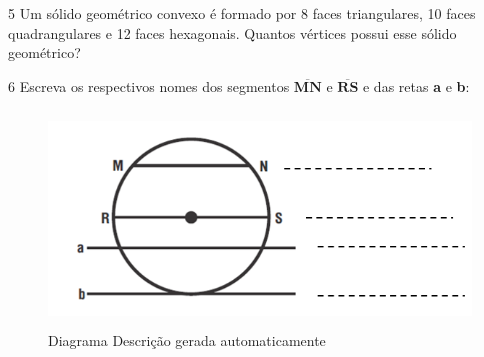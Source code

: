 \begin{escolha}
\begin{boxmedio}
\begin{boxmedio}
{\begin{boxpeq}
\begin{boxpeq}
{\begin{boxpeq}
\begin{boxmedio}
\begin{boxmedio}
\begin{boxpeq}
\begin{boxmedio}
\begin{boxpeq}
\begin{boxpeq}
\begin{boxpeq}
\begin{boxpeq}
\begin{boxmedio}
{\begin{boxmedio}
\begin{boxmedio}
\begin{boxpeq}
\begin{boxmedio}
\begin{boxpeq}
\begin{boxpeq}
\begin{boxpeq}
\begin{escolha}
{\begin{boxmedio}
\begin{boxpeq}
\begin{boxpeq}
\begin{boxpeq}
\begin{boxpeq}
\begin{boxpeq}
\begin{boxmedio}
\begin{boxpeq}
\begin{boxpeq}
\begin{boxpeq}
{\begin{boxpeq}
\begin{boxmedio}
\begin{boxpeq}
\begin{boxpeq}
\begin{boxpeq}
{\begin{boxpeq}
\begin{boxmedio}
{\begin{boxpeq}
\begin{boxpeq}
\begin{boxmedio}
\begin{boxmedio}
\begin{boxpeq}
\begin{boxpeq}
{\begin{boxpeq}
\begin{boxpeq}
\begin{boxpeq}
\begin{boxpeq}
\num{5} Um sólido geométrico convexo é formado por 8 faces triangulares, 10
faces quadrangulares e 12 faces hexagonais. Quantos vértices possui esse
sólido geométrico?



\num{6} Escreva os respectivos nomes dos segmentos
$\overline{\mathbf{\text{MN}}}$ e $\overline{\mathbf{\text{RS}}}$ e
das retas \textbf{a} e \textbf{b}:

\begin{figure}
\centering
\includegraphics[width=4.87542in,height=2.25019in]{./_SAEB_9_MAT/media/image168.png}
\caption{Diagrama Descrição gerada automaticamente}
\end{figure}


\end{boxpeq}
\end{boxpeq}
\end{boxpeq}
\end{boxpeq}}
\end{boxpeq}
\end{boxpeq}
\end{boxmedio}
\end{boxmedio}
\end{boxpeq}
\end{boxpeq}}
\end{boxmedio}
\end{boxpeq}}
\end{boxpeq}
\end{boxpeq}
\end{boxpeq}
\end{boxmedio}
\end{boxpeq}}
\end{boxpeq}
\end{boxpeq}
\end{boxpeq}
\end{boxmedio}
\end{boxpeq}
\end{boxpeq}
\end{boxpeq}
\end{boxpeq}
\end{boxpeq}
\end{boxmedio}}
\end{escolha}
\end{boxpeq}
\end{boxpeq}
\end{boxpeq}
\end{boxmedio}
\end{boxpeq}
\end{boxmedio}
\end{boxmedio}}
\end{boxmedio}
\end{boxpeq}
\end{boxpeq}
\end{boxpeq}
\end{boxpeq}
\end{boxmedio}
\end{boxpeq}
\end{boxmedio}
\end{boxmedio}
\end{boxpeq}}
\end{boxpeq}
\end{boxpeq}}
\end{boxmedio}
\end{boxmedio}
\end{escolha}
